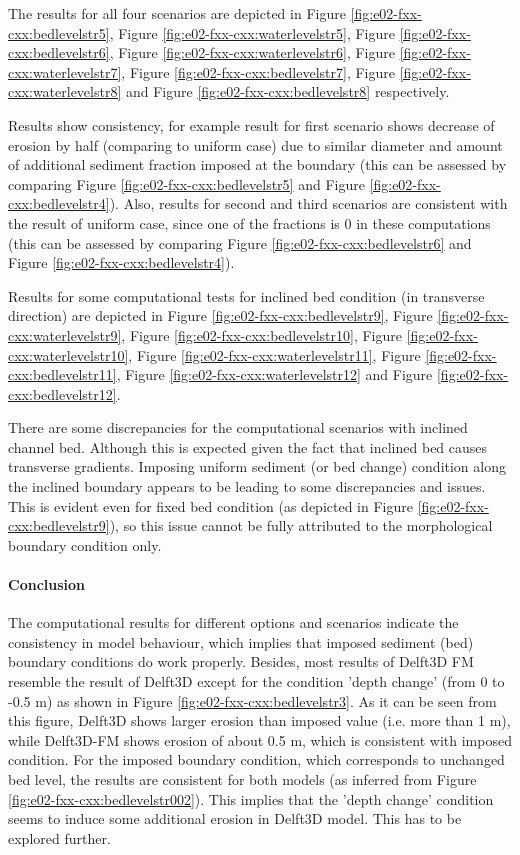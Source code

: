 The results for all four scenarios are depicted in Figure \ref{fig:e02-fxx-cxx:bedlevelstr5}, Figure \ref{fig:e02-fxx-cxx:waterlevelstr5}, Figure \ref{fig:e02-fxx-cxx:bedlevelstr6}, Figure \ref{fig:e02-fxx-cxx:waterlevelstr6}, Figure \ref{fig:e02-fxx-cxx:waterlevelstr7}, Figure \ref{fig:e02-fxx-cxx:bedlevelstr7}, Figure \ref{fig:e02-fxx-cxx:waterlevelstr8} and Figure \ref{fig:e02-fxx-cxx:bedlevelstr8} respectively.  

Results show consistency, for example result for first scenario shows decrease of erosion by half (comparing to uniform case) due to similar diameter and amount of additional sediment fraction imposed at the boundary (this can be assessed by comparing Figure \ref{fig:e02-fxx-cxx:bedlevelstr5} and Figure \ref{fig:e02-fxx-cxx:bedlevelstr4}). Also, results for second and third scenarios are consistent with the result of uniform case, since one of the fractions is 0 in these computations (this can be assessed by comparing Figure \ref{fig:e02-fxx-cxx:bedlevelstr6} and Figure \ref{fig:e02-fxx-cxx:bedlevelstr4}).

Results for some computational tests for inclined bed condition (in transverse direction) are depicted in Figure \ref{fig:e02-fxx-cxx:bedlevelstr9}, Figure \ref{fig:e02-fxx-cxx:waterlevelstr9}, Figure \ref{fig:e02-fxx-cxx:bedlevelstr10}, Figure \ref{fig:e02-fxx-cxx:waterlevelstr10}, Figure \ref{fig:e02-fxx-cxx:waterlevelstr11}, Figure \ref{fig:e02-fxx-cxx:bedlevelstr11}, Figure \ref{fig:e02-fxx-cxx:waterlevelstr12} and Figure \ref{fig:e02-fxx-cxx:bedlevelstr12}. 

There are some discrepancies for the computational scenarios with inclined channel bed.  Although this is expected given the fact that inclined bed causes transverse gradients. Imposing uniform sediment (or bed change) condition along the inclined boundary appears to be leading to some discrepancies and issues. This is evident even for fixed bed condition (as depicted in Figure \ref{fig:e02-fxx-cxx:bedlevelstr9}), so this issue cannot be fully attributed to the morphological boundary condition only. 
    

\paragraph*{Conclusion}

The computational results for different options and scenarios indicate the consistency in model behaviour, which implies that imposed sediment (bed) boundary conditions do work properly. Besides, most results of Delft3D FM resemble the result of Delft3D except for the condition 'depth change' (from 0 to -0.5 m) as shown in Figure \ref{fig:e02-fxx-cxx:bedlevelstr3}. As it can be seen from this figure, Delft3D shows larger erosion than imposed value (i.e. more than 1 m), while Delft3D-FM shows erosion of about 0.5 m, which is consistent with imposed condition. For the imposed boundary condition, which corresponds to unchanged bed level, the results are consistent for both models (as inferred from Figure \ref{fig:e02-fxx-cxx:bedlevelstr002}). This implies that the 'depth change' condition seems to induce some additional erosion in Delft3D model. This has to be explored further. 

